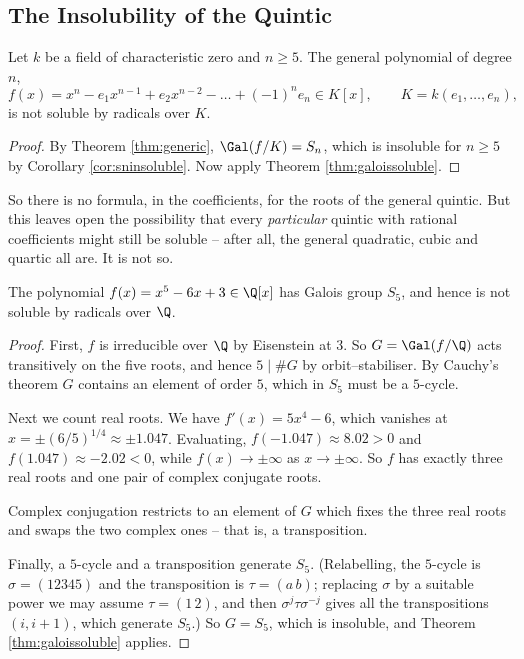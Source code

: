 \subsection{The Insolubility of the Quintic}

\begin{theorem}\label{thm:generalquintic}
	Let $k$ be a field of characteristic zero and $n \geq 5$. The general polynomial of degree $n$,
	$$f(x) = x^n - e_1x^{n-1}+e_2x^{n-2}-\dots+(-1)^ne_n \in K[x], \qquad K = k(e_1,\dots,e_n),$$
	is not soluble by radicals over $K$.
\end{theorem}

\begin{proof}
	By Theorem \ref{thm:generic}, $\Gal(f/K) = S_n$, which is insoluble for $n\geq 5$ by Corollary \ref{cor:sninsoluble}. Now apply Theorem \ref{thm:galoissoluble}.
\end{proof}

So there is no formula, in the coefficients, for the roots of the general quintic. But this leaves open the possibility that every \emph{particular} quintic with rational coefficients might still be soluble -- after all, the general quadratic, cubic and quartic all are. It is not so.

\begin{theorem}
	The polynomial $f(x) = x^5 - 6x + 3 \in \Q[x]$ has Galois group $S_5$, and hence is not soluble by radicals over $\Q$.
\end{theorem}

\begin{proof}
	First, $f$ is irreducible over $\Q$ by Eisenstein at $3$. So $G = \Gal(f/\Q)$ acts transitively on the five roots, and hence $5 \mid \#G$ by orbit--stabiliser. By Cauchy's theorem $G$ contains an element of order $5$, which in $S_5$ must be a $5$-cycle.

	Next we count real roots. We have $f'(x) = 5x^4-6$, which vanishes at $x = \pm(6/5)^{1/4}\approx\pm1.047$. Evaluating, $f(-1.047)\approx 8.02 > 0$ and $f(1.047)\approx -2.02 < 0$, while $f(x)\to\pm\infty$ as $x \to\pm\infty$. So $f$ has exactly three real roots and one pair of complex conjugate roots.

	Complex conjugation restricts to an element of $G$ which fixes the three real roots and swaps the two complex ones -- that is, a transposition.

	Finally, a $5$-cycle and a transposition generate $S_5$. (Relabelling, the $5$-cycle is $\sigma = (1 2 3 4 5)$ and the transposition is $\tau = (a\, b)$; replacing $\sigma$ by a suitable power we may assume $\tau = (1\,2)$, and then $\sigma^{j}\tau\sigma^{-j}$ gives all the transpositions $(i, i+1)$, which generate $S_5$.) So $G = S_5$, which is insoluble, and Theorem \ref{thm:galoissoluble} applies.
\end{proof}

